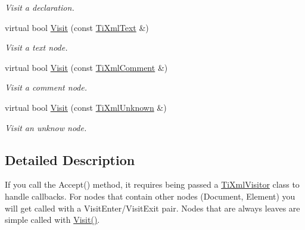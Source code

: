 \begin{DoxyCompactItemize}
\begin{DoxyCompactList}\small\item\em \-Visit a declaration. \end{DoxyCompactList}\item 
\hypertarget{classTiXmlVisitor_a399b8ebca5cd14664974a32d2ce029e5}{
virtual bool \hyperlink{classTiXmlVisitor_a399b8ebca5cd14664974a32d2ce029e5}{\-Visit} (const \hyperlink{classTiXmlText}{\-Ti\-Xml\-Text} \&)}
\label{d9/d74/classTiXmlVisitor_a399b8ebca5cd14664974a32d2ce029e5}

\begin{DoxyCompactList}\small\item\em \-Visit a text node. \end{DoxyCompactList}\item 
\hypertarget{classTiXmlVisitor_a53a60e7a528627b31af3161972cc7fa2}{
virtual bool \hyperlink{classTiXmlVisitor_a53a60e7a528627b31af3161972cc7fa2}{\-Visit} (const \hyperlink{classTiXmlComment}{\-Ti\-Xml\-Comment} \&)}
\label{d9/d74/classTiXmlVisitor_a53a60e7a528627b31af3161972cc7fa2}

\begin{DoxyCompactList}\small\item\em \-Visit a comment node. \end{DoxyCompactList}\item 
\hypertarget{classTiXmlVisitor_a7e284d607d275c51dac1adb58159ce28}{
virtual bool \hyperlink{classTiXmlVisitor_a7e284d607d275c51dac1adb58159ce28}{\-Visit} (const \hyperlink{classTiXmlUnknown}{\-Ti\-Xml\-Unknown} \&)}
\label{d9/d74/classTiXmlVisitor_a7e284d607d275c51dac1adb58159ce28}

\begin{DoxyCompactList}\small\item\em \-Visit an unknow node. \end{DoxyCompactList}\end{DoxyCompactItemize}


\subsection{\-Detailed \-Description}
\-If you call the \-Accept() method, it requires being passed a \hyperlink{classTiXmlVisitor}{\-Ti\-Xml\-Visitor} class to handle callbacks. \-For nodes that contain other nodes (\-Document, \-Element) you will get called with a \-Visit\-Enter/\-Visit\-Exit pair. \-Nodes that are always leaves are simple called with \hyperlink{classTiXmlVisitor_afad71c71ce6473fb9b4b64cd92de4a19}{\-Visit()}.

